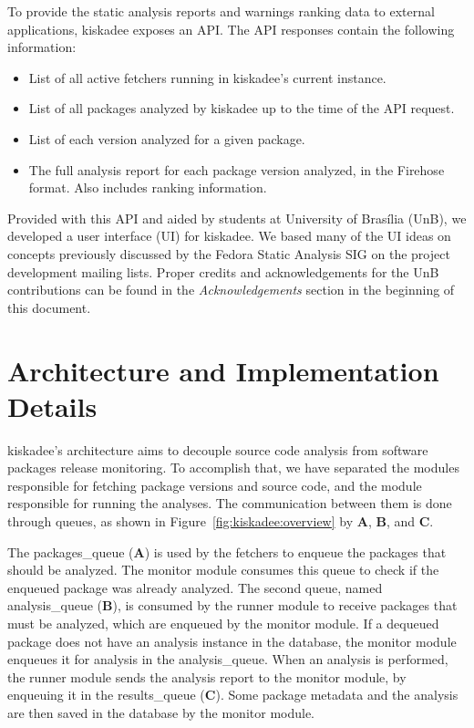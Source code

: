 To provide the static analysis reports and warnings ranking data to external
applications, kiskadee exposes an API. The API responses contain the following information:

\begin{itemize}
  \item List of all active fetchers running in kiskadee's current instance.

  \item List of all packages analyzed by kiskadee up to the time of the API request.

  \item List of each version analyzed for a given package.

  \item The full analysis report for each package version analyzed, in the Firehose format. Also includes ranking information.
\end{itemize}

Provided with this API and aided by students at University of Brasília (UnB),
we developed a user interface (UI) for kiskadee. We based many of the UI ideas
on concepts previously discussed by the Fedora Static Analysis SIG on the
project development mailing lists. Proper credits and acknowledgements for the
UnB contributions can be found in the \emph{Acknowledgements} section in the
beginning of this document.



\section{Architecture and Implementation Details}
\label{sec:implementation}

kiskadee's architecture aims to decouple source code analysis from software
packages release monitoring. To accomplish that, we have separated the modules
responsible for fetching package versions and source code, and the module
responsible for running the analyses. The communication between them is done through
queues, as shown in Figure~\ref{fig:kiskadee:overview} by \textbf{A},
\textbf{B}, and \textbf{C}.

The packages\_queue (\textbf{A}) is used by the fetchers to enqueue the
packages that should be analyzed. The monitor module consumes this queue
to check if the enqueued package was already analyzed. The second queue, named
analysis\_queue (\textbf{B}), is consumed by the runner module to receive
packages that must be analyzed, which are enqueued by the monitor module. If a
dequeued package does not have an analysis instance in the database, the
monitor module enqueues it for analysis in the analysis\_queue.  When an
analysis is performed, the runner module sends the analysis report to the
monitor module, by enqueuing it in the results\_queue (\textbf{C}). Some package
metadata and the analysis are then saved in the database by the monitor module.


